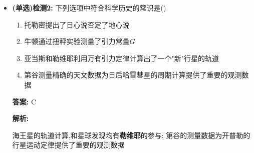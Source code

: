 \documentclass{article}
\begin{document}
\begin{itemize}
\begin{enumerate}
                    \hspace{-1em}\begin{adjustbox}{minipage=0.91\linewidth, bgcolor=gray!20, padding=1em}
                        \small %
                        石英丝连接细杆,两端放置等大质量球,在两球附近放置两大质量球产生引力矩,用光线反射法放大扭转

                        \vspace{-1em}

                        $$ \theta \propto \text{力矩} \quad \lra  \quad k\theta = 2F_{G}L \quad (k\text{为比例系数需提前测量}) $$
                    \end{adjustbox}

                    \vspace{-1em}

              \item 亚当斯和勒维耶利用万有引力定律计算出了"新"行星的轨道
              \item 伽勒和勒维耶发现了这颗行星,后被命名为海王星
              \item 哈雷利用万有引力预言了同一彗星的按时回归,后被命名为"哈雷彗星"
              \item 钱学森被誉为"中国航天之父",地球同步卫星的(赤道)轨道高度$36000km$
              \item 阿姆斯特朗:人类登月第一人 \quad 杨利伟:中国登月第一人
          \end{enumerate}

          \vspace{0.5em}

    \item[] \textbf{(单选)检测2:} 下列选项中符合科学历史的常识是(\qquad)

        \begin{enumerate}[label=\Alph*.]
            \item 托勒密提出了日心说否定了地心说
            \item 牛顿通过扭秤实验测量了引力常量$G$
            \item 亚当斯和勒维耶利用万有引力定律计算出了一个"新"行星的轨道
            \item 第谷测量精确的天文数据为日后哈雷彗星的周期计算提供了重要的观测数据
        \end{enumerate}

        \textbf{答案:} C

        \textbf{解析:}

        \hspace{2em}海王星的轨道计算,和星球发现均有\textbf{勒维耶}的参与;
        第谷的测量数据为开普勒的行星运动定律提供了重要的观测数据


\end{itemize}
\end{document}
